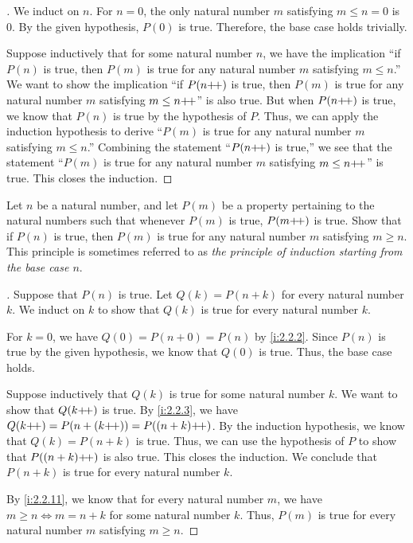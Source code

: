 \begin{proof}[]
  We induct on \(n\).
  For \(n = 0\), the only natural number \(m\) satisfying \(m \leq n = 0\) is \(0\).
  By the given hypothesis, \(P(0)\) is true.
  Therefore, the base case holds trivially.

  Suppose inductively that for some natural number \(n\), we have the implication ``if \(P(n)\) is true, then \(P(m)\) is true for any natural number \(m\) satisfying \(m \leq n\).''
  We want to show the implication ``if \(P(n{+}\!{+})\) is true, then \(P(m)\) is true for any natural number \(m\) satisfying \(m \leq n{+}\!{+}\)'' is also true.
  But when \(P(n{+}\!{+})\) is true, we know that \(P(n)\) is true by the hypothesis of \(P\).
  Thus, we can apply the induction hypothesis to derive ``\(P(m)\) is true for any natural number \(m\) satisfying \(m \leq n\).''
  Combining the statement ``\(P(n{+}\!{+})\) is true,'' we see that the statement ``\(P(m)\) is true for any natural number \(m\) satisfying \(m \leq n{+}\!{+}\)'' is true.
  This closes the induction.
\end{proof}

\begin{ex}\label{i:ex:2.2.7}
  Let \(n\) be a natural number, and let \(P(m)\) be a property pertaining to the natural numbers such that whenever \(P(m)\) is true, \(P(m{+}\!{+})\) is true.
  Show that if \(P(n)\) is true, then \(P(m)\) is true for any natural number \(m\) satisfying \(m \geq n\).
  This principle is sometimes referred to as \emph{the principle of induction starting from the base case \(n\)}.
\end{ex}

\begin{proof}[]
  Suppose that \(P(n)\) is true.
  Let \(Q(k) = P(n + k)\) for every natural number \(k\).
  We induct on \(k\) to show that \(Q(k)\) is true for every natural number \(k\).

  For \(k = 0\), we have \(Q(0) = P(n + 0) = P(n)\) by \cref{i:2.2.2}.
  Since \(P(n)\) is true by the given hypothesis, we know that \(Q(0)\) is true.
  Thus, the base case holds.

  Suppose inductively that \(Q(k)\) is true for some natural number \(k\).
  We want to show that \(Q(k{+}\!{+})\) is true.
  By \cref{i:2.2.3}, we have \(Q(k{+}\!{+}) = P(n + (k{+}\!{+})) = P((n + k){+}\!{+})\).
  By the induction hypothesis, we know that \(Q(k) = P(n + k)\) is true.
  Thus, we can use the hypothesis of \(P\) to show that \(P((n + k){+}\!{+})\) is also true.
  This closes the induction.
  We conclude that \(P(n + k)\) is true for every natural number \(k\).

  By \cref{i:2.2.11}, we know that for every natural number \(m\), we have \(m \geq n \iff m = n + k\) for some natural number \(k\).
  Thus, \(P(m)\) is true for every natural number \(m\) satisfying \(m \geq n\).
\end{proof}
